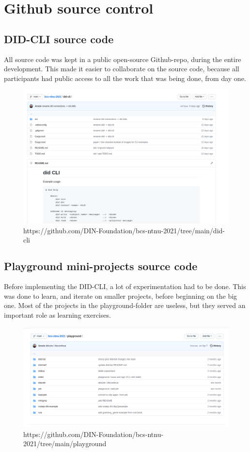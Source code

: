 \newpage

\section{Github source control}
\subsection{DID-CLI source code} 

All source code was kept in a public open-source Github-repo, during the entire development. This made it easier to 
collaborate on the source code, because all participants had public access to all the work that was being done, from day one.

    \begin{figure}[htbp]
      \centering
      \includegraphics[width=.7\textwidth]{figures/github-implementation}
      \caption[DID CLI]{https://github.com/DIN-Foundation/bcs-ntnu-2021/tree/main/did-cli}
    \end{figure}
    
    
\subsection{Playground mini-projects source code}

Before implementing the DID-CLI, a lot of experimentation had to be done. This was done to learn, and iterate on smaller projects, before beginning on the big one. Most of the projects in the playground-folder are useless, but they served an important role as learning exercises.
    
    \begin{figure}[htbp]
      \centering
      \includegraphics[width=.7\textwidth]{figures/github-playground}
      \caption[Playground]{https://github.com/DIN-Foundation/bcs-ntnu-2021/tree/main/playground}
    \end{figure}




